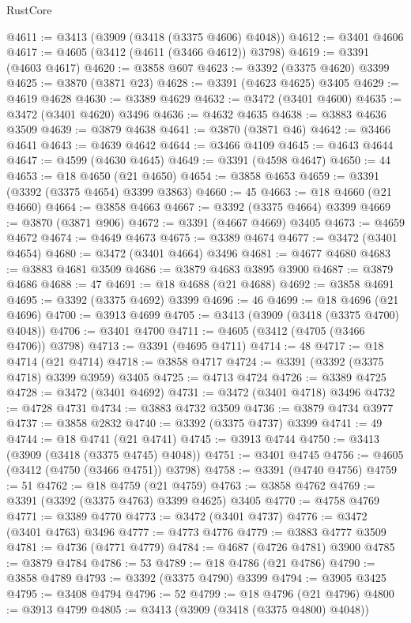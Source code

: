 \begin{lexlean}{RustCore}
\begin{coremodule}
@4611 := @3413 (@3909 (@3418 (@3375 @4606) @4048))
@4612 := @3401 @4606
@4617 := @4605 (@3412 (@4611 (@3466 @4612)) @3798)
@4619 := @3391 (@4603 @4617)
@4620 := @3858 @607
@4623 := @3392 (@3375 @4620) @3399
@4625 := @3870 (@3871 @23)
@4628 := @3391 (@4623 @4625) @3405
@4629 := @4619 @4628
@4630 := @3389 @4629
@4632 := @3472 (@3401 @4600)
@4635 := @3472 (@3401 @4620) @3496
@4636 := @4632 @4635
@4638 := @3883 @4636 @3509
@4639 := @3879 @4638
@4641 := @3870 (@3871 @46)
@4642 := @3466 @4641
@4643 := @4639 @4642
@4644 := @3466 @4109
@4645 := @4643 @4644
@4647 := @4599 (@4630 @4645)
@4649 := @3391 (@4598 @4647)
@4650 := 44
@4653 := @18 @4650 (@21 @4650)
@4654 := @3858 @4653
@4659 := @3391 (@3392 (@3375 @4654) @3399 @3863)
@4660 := 45
@4663 := @18 @4660 (@21 @4660)
@4664 := @3858 @4663
@4667 := @3392 (@3375 @4664) @3399
@4669 := @3870 (@3871 @906)
@4672 := @3391 (@4667 @4669) @3405
@4673 := @4659 @4672
@4674 := @4649 @4673
@4675 := @3389 @4674
@4677 := @3472 (@3401 @4654)
@4680 := @3472 (@3401 @4664) @3496
@4681 := @4677 @4680
@4683 := @3883 @4681 @3509
@4686 := @3879 @4683 @3895 @3900
@4687 := @3879 @4686
@4688 := 47
@4691 := @18 @4688 (@21 @4688)
@4692 := @3858 @4691
@4695 := @3392 (@3375 @4692) @3399
@4696 := 46
@4699 := @18 @4696 (@21 @4696)
@4700 := @3913 @4699
@4705 := @3413 (@3909 (@3418 (@3375 @4700) @4048))
@4706 := @3401 @4700
@4711 := @4605 (@3412 (@4705 (@3466 @4706)) @3798)
@4713 := @3391 (@4695 @4711)
@4714 := 48
@4717 := @18 @4714 (@21 @4714)
@4718 := @3858 @4717
@4724 := @3391 (@3392 (@3375 @4718) @3399 @3959) @3405
@4725 := @4713 @4724
@4726 := @3389 @4725
@4728 := @3472 (@3401 @4692)
@4731 := @3472 (@3401 @4718) @3496
@4732 := @4728 @4731
@4734 := @3883 @4732 @3509
@4736 := @3879 @4734 @3977
@4737 := @3858 @2832
@4740 := @3392 (@3375 @4737) @3399
@4741 := 49
@4744 := @18 @4741 (@21 @4741)
@4745 := @3913 @4744
@4750 := @3413 (@3909 (@3418 (@3375 @4745) @4048))
@4751 := @3401 @4745
@4756 := @4605 (@3412 (@4750 (@3466 @4751)) @3798)
@4758 := @3391 (@4740 @4756)
@4759 := 51
@4762 := @18 @4759 (@21 @4759)
@4763 := @3858 @4762
@4769 := @3391 (@3392 (@3375 @4763) @3399 @4625) @3405
@4770 := @4758 @4769
@4771 := @3389 @4770
@4773 := @3472 (@3401 @4737)
@4776 := @3472 (@3401 @4763) @3496
@4777 := @4773 @4776
@4779 := @3883 @4777 @3509
@4781 := @4736 (@4771 @4779)
@4784 := @4687 (@4726 @4781) @3900
@4785 := @3879 @4784
@4786 := 53
@4789 := @18 @4786 (@21 @4786)
@4790 := @3858 @4789
@4793 := @3392 (@3375 @4790) @3399
@4794 := @3905 @3425
@4795 := @3408 @4794
@4796 := 52
@4799 := @18 @4796 (@21 @4796)
@4800 := @3913 @4799
@4805 := @3413 (@3909 (@3418 (@3375 @4800) @4048))

\end{coremodule}
\end{lexlean}
